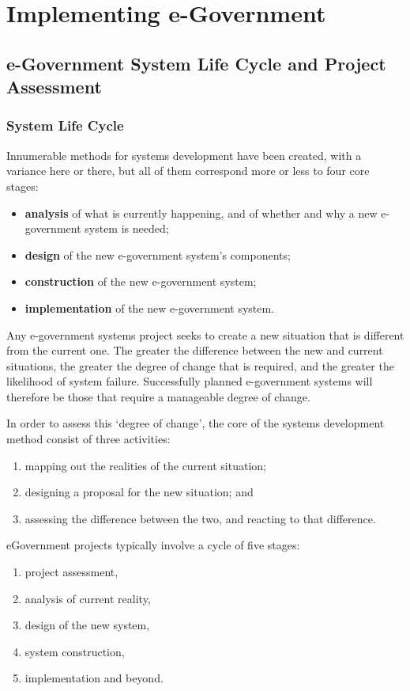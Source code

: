\chapter{Implementing e-Government}
\section{e-Government System Life Cycle and Project Assessment}
\subsection{System Life Cycle}
Innumerable methods for systems development have been created, with a variance
here or there, but all of them correspond
more or less to four core stages:

\begin{itemize}
\item \textbf{analysis} of what is currently happening, and
of whether and why a new e-government
system is needed;
\item \textbf{design} of the new e-government system’s
components;
\item \textbf{construction} of the new e-government
system;
\item \textbf{implementation} of the new e-government
system.
\end{itemize}

Any e-government systems project seeks to create a new situation that is different from the current one. The greater the difference between the new and current situations, the greater the degree of change that is required, and the greater the likelihood of system failure. Successfully planned e-government systems will therefore be those that require a manageable degree of change. 

In order to assess this `degree of change', the core of the systems development method consist of three activities:

\begin{enumerate}
\item mapping out the realities of the current
situation;
\item designing a proposal for the new situation; and
\item assessing the difference between the two,
and reacting to that difference.
\end{enumerate}


eGovernment projects typically involve a cycle of five stages: 
\begin{multicols}{2}
	\begin{enumerate}
		\item project assessment,
		\item analysis of current reality, 
		\item design of the new system, 
		\item system construction, 
		\item implementation and beyond.
	\end{enumerate}
\end{multicols}


